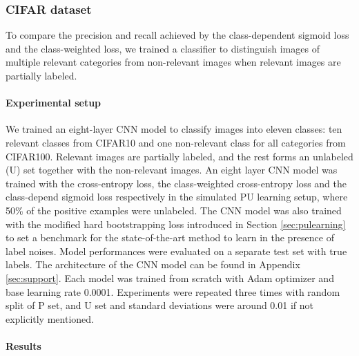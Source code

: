 \subsubsection{CIFAR dataset}

To compare the precision and recall achieved by the class-dependent sigmoid loss and the class-weighted loss, we trained a classifier to distinguish images of multiple relevant categories from non-relevant images when relevant images are partially labeled.

\paragraph{Experimental setup}
We trained an eight-layer CNN model to classify images into eleven classes: ten relevant classes from CIFAR10 and one non-relevant class for all categories from CIFAR100.
Relevant images are partially labeled, and the rest forms an unlabeled (U) set together with the non-relevant images.
An eight layer CNN model was trained with the cross-entropy loss, the class-weighted cross-entropy loss and the class-depend sigmoid loss respectively in the simulated PU learning setup, where 50\% of the positive examples were unlabeled.
The CNN model was also trained with the modified hard bootstrapping loss introduced in Section \ref{sec:pulearning} to set a benchmark for the state-of-the-art method to learn in the presence of label noises.
Model performances were evaluated on a separate test set with true labels.
The architecture of the CNN model can be found in Appendix \ref{sec:support}.
Each model was trained from scratch with Adam optimizer and base learning rate 0.0001.
Experiments were repeated three times with random split of P set, and U set and standard deviations were around 0.01 if not explicitly mentioned.


\paragraph{Results}

